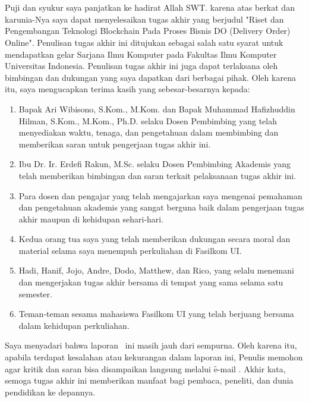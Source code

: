 \chapter*{\kataPengantar}
\pagestyle{first-pages}

Puji dan syukur saya panjatkan ke hadirat Allah SWT. karena atas berkat dan karunia-Nya saya dapat menyelesaikan tugas akhir yang berjudul "Riset dan Pengembangan Teknologi Blockchain Pada Proses Bisnis DO (Delivery Order) Online". Penulisan tugas akhir ini ditujukan sebagai salah satu syarat untuk mendapatkan gelar Sarjana Ilmu Komputer pada Fakultas Ilmu Komputer Universitas Indonesia. Penulisan tugas akhir ini juga dapat terlaksana oleh bimbingan dan dukungan yang saya dapatkan dari berbagai pihak. Oleh karena itu, saya mengucapkan terima kasih yang sebesar-besarnya kepada:

\begin{enumerate}[topsep=0pt,itemsep=-1ex,partopsep=1ex,parsep=1ex]
	\item Bapak Ari Wibisono, S.Kom., M.Kom. dan Bapak Muhammad Hafizhuddin Hilman, S.Kom., M.Kom., Ph.D. selaku Dosen Pembimbing yang telah menyediakan waktu, tenaga, dan pengetahuan dalam membimbing dan memberikan saran untuk pengerjaan tugas akhir ini.
	\item Ibu Dr. Ir. Erdefi Rakun, M.Sc. selaku Dosen Pembimbing Akademis yang telah memberikan bimbingan dan saran terkait pelaksanaan tugas akhir ini.
	\item Para dosen dan pengajar yang telah mengajarkan saya mengenai pemahaman dan pengetahuan akademis yang sangat berguna baik dalam pengerjaan tugas akhir maupun di kehidupan sehari-hari.
	\item Kedua orang tua saya yang telah memberikan dukungan secara moral dan material selama saya menempuh perkuliahan di Fasilkom UI.
	\item Hadi, Hanif, Jojo, Andre, Dodo, Matthew, dan Rico, yang selalu menemani dan mengerjakan tugas akhir bersama di tempat yang sama selama satu semester.
	\item Teman-teman sesama mahasiswa Fasilkom UI yang telah berjuang bersama dalam kehidupan perkuliahan.
\end{enumerate}

Saya menyadari bahwa laporan \type~ini masih jauh dari sempurna. Oleh karena itu, apabila terdapat kesalahan atau kekurangan dalam laporan ini, Penulis memohon agar kritik dan saran bisa disampaikan langsung melalui \f{e-mail} . Akhir kata, semoga tugas akhir ini memberikan manfaat bagi pembaca, peneliti, dan dunia pendidikan ke depannya.


